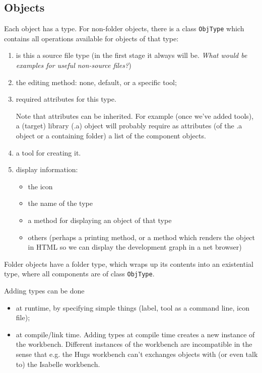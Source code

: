 \documentclass[a4paper]{article}
\begin{document}
\subsection{Objects}

Each object has a type. For non-folder objects, there is a class
\texttt{ObjType} which contains all operations available for objects
of that type:

\begin{enumerate}
\item is this a source file type (in the first stage it always will
  be. \emph{What would be examples for useful non-source files?})
\item the editing method: none, default, or a specific tool;
\item required attributes for this type. 
  
  Note that attributes can be inherited.  For example (once we've
  added tools), a (target) library (.a) object will probably require
  as attributes (of the .a object or a containing folder) a list of
  the component objects.
\item a tool for creating it.
\item display information:
  \begin{itemize}
  \item the icon
  \item the name of the type
  \item a method for displaying an object of that type
  \item others (perhaps a printing method, or a method which renders
    the object in HTML so we can display the development graph in a
    net browser)
  \end{itemize}
\end{enumerate}

Folder objects have a folder type, which wraps up its contents into an
existential type, where all components are of class \texttt{ObjType}.

Adding types can be done 
\begin{itemize}
\item at runtime, by specifying simple things (label, tool as a
  command line, icon file);
\item at compile/link time. Adding types at compile time creates a new
  instance of the workbench. Different instances of the workbench are
  incompatible in the sense that e.g. the Hugs workbench can't
  exchanges objects with (or even talk to) the Isabelle workbench.
\end{itemize}
\end{document}
